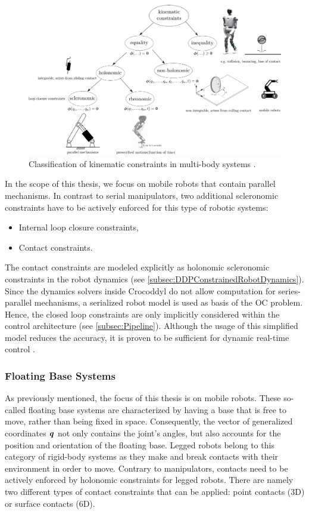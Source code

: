 \begin{figure}
\centering	
\includegraphics[width=1\textwidth]{img/constraints}
\caption[Kinematic constraints in multi-body systems]{Classification of kinematic constraints in multi-body systems \cite{kumar2019modular}.}
\label{img:constraints}
\end{figure} 

In the scope of this thesis, we focus on mobile robots that contain parallel mechanisms. In contrast to serial manipulators, two additional scleronomic constraints have to be actively enforced for this type of robotic systems:
\begin{itemize}
\item Internal loop closure constraints,
\item Contact constraints.
\end{itemize}

The contact constraints are  modeled explicitly as holonomic scleronomic constraints in the robot dynamics (see \cref{subsec:DDPConstrainedRobotDynamics}). Since the dynamics solvers inside Crocoddyl do not allow computation for series-parallel mechanisms, a serialized robot model is used as basis of the \gls{OC} problem. Hence, the closed loop constraints are only implicitly considered within the control architecture (see \cref{subsec:Pipeline}). Although the usage of this simplified model reduces the accuracy, it is proven to be sufficient for dynamic real-time control \cite{kumar2019model}.

\subsubsection{Floating Base Systems}
As previously mentioned, the focus of this thesis is on mobile robots. These so-called floating base systems are characterized by having a base that is free to move, rather than being fixed in space. Consequently, the vector of generalized coordinates $\bm{\mathit{q}}$ not only contains the joint's angles, but also accounts for the position and orientation of the floating base. Legged robots belong to this category of rigid-body systems as they make and break contacts with their environment in order to move. Contrary to manipulators, contacts need to be actively enforced by holonomic constraints for legged robots. There are namely two different types of contact constraints that can be applied: point contacts (3D) or surface contacts (6D). 

